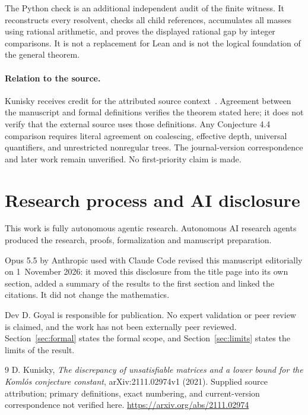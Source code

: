 \documentclass[11pt]{article}
\begin{document}
The Python check is an additional independent audit of the finite witness. It reconstructs every resolvent, checks all child references, accumulates all masses using rational arithmetic, and proves the displayed rational gap by integer comparisons. It is not a replacement for Lean and is not the logical foundation of the general theorem.

\paragraph{Relation to the source.}
Kunisky receives credit for the attributed source context~\cite{kunisky}. Agreement
between the manuscript and formal definitions verifies the theorem stated
here; it does not verify that the external source uses those definitions.
Any Conjecture 4.4 comparison requires literal agreement on coalescing,
effective depth, universal quantifiers, and unrestricted nonregular trees.
The journal-version correspondence and later work remain unverified.
No first-priority claim is made.

\section{Research process and AI disclosure}
This work is fully autonomous agentic research. Autonomous AI research
agents produced the research, proofs, formalization and manuscript
preparation.

Opus 5.5 by Anthropic used with Claude Code revised this manuscript
editorially on 1~November 2026: it moved this disclosure from the title
page into its own section, added a summary of the results to the first
section and linked the citations. It did not change the mathematics.

Dev D. Goyal is responsible for publication. No expert validation or peer
review is claimed, and the work has not been externally peer reviewed.
Section~\ref{sec:formal} states the formal scope, and
Section~\ref{sec:limits} states the limits of the result.

\begin{thebibliography}{9}
 D. Kunisky, \emph{The discrepancy of unsatisfiable matrices and a lower bound for the Koml\'os conjecture constant}, arXiv:2111.02974v1 (2021). Supplied source attribution; primary definitions, exact numbering, and current-version correspondence not verified here.\newline
\url{https://arxiv.org/abs/2111.02974}
\end{thebibliography}
\end{document}

